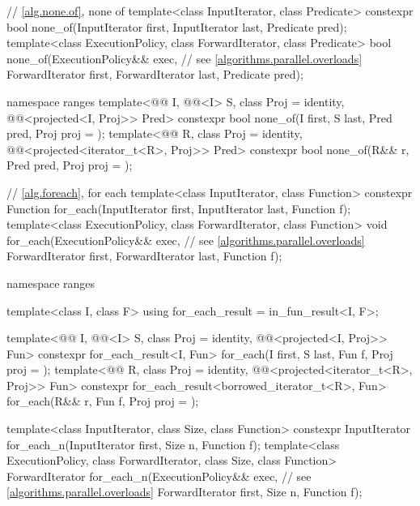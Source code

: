\begin{codeblock}
{  // \ref{alg.none.of}, none of
  template<class InputIterator, class Predicate>
    constexpr bool none_of(InputIterator first, InputIterator last, Predicate pred);
  template<class ExecutionPolicy, class ForwardIterator, class Predicate>
    bool none_of(ExecutionPolicy&& exec,                        // see \ref{algorithms.parallel.overloads}
                 ForwardIterator first, ForwardIterator last, Predicate pred);

  namespace ranges {
    template<@@ I, @@<I> S, class Proj = identity,
             @@<projected<I, Proj>> Pred>
      constexpr bool none_of(I first, S last, Pred pred, Proj proj = {});
    template<@@ R, class Proj = identity,
             @@<projected<iterator_t<R>, Proj>> Pred>
      constexpr bool none_of(R&& r, Pred pred, Proj proj = {});
  }

  // \ref{alg.foreach}, for each
  template<class InputIterator, class Function>
    constexpr Function for_each(InputIterator first, InputIterator last, Function f);
  template<class ExecutionPolicy, class ForwardIterator, class Function>
    void for_each(ExecutionPolicy&& exec,                       // see \ref{algorithms.parallel.overloads}
                  ForwardIterator first, ForwardIterator last, Function f);

  namespace ranges {
    template<class I, class F>
      using for_each_result = in_fun_result<I, F>;

    template<@@ I, @@<I> S, class Proj = identity,
             @@<projected<I, Proj>> Fun>
      constexpr for_each_result<I, Fun>
        for_each(I first, S last, Fun f, Proj proj = {});
    template<@@ R, class Proj = identity,
             @@<projected<iterator_t<R>, Proj>> Fun>
      constexpr for_each_result<borrowed_iterator_t<R>, Fun>
        for_each(R&& r, Fun f, Proj proj = {});
  }

  template<class InputIterator, class Size, class Function>
    constexpr InputIterator for_each_n(InputIterator first, Size n, Function f);
  template<class ExecutionPolicy, class ForwardIterator, class Size, class Function>
    ForwardIterator for_each_n(ExecutionPolicy&& exec,          // see \ref{algorithms.parallel.overloads}
                               ForwardIterator first, Size n, Function f);

}
\end{codeblock}
